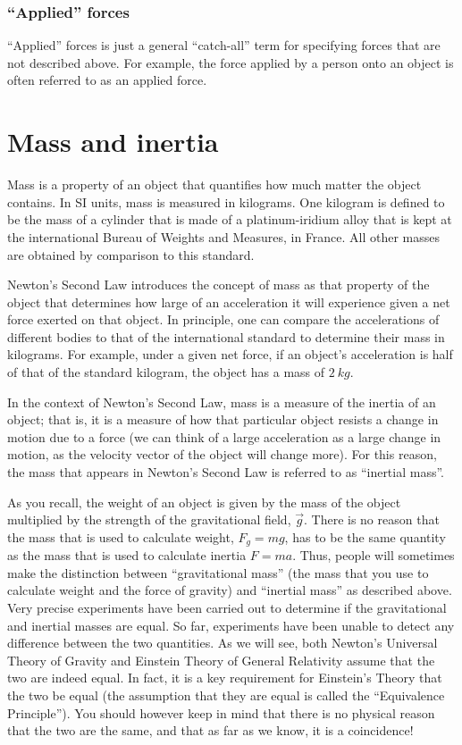 \subsubsection{``Applied'' forces}
``Applied'' forces is just a general ``catch-all'' term for specifying forces that are not described above. For example, the force applied by a person onto an object is often referred to as an applied force. 

\section{Mass and inertia}
Mass is a property of an object that quantifies how much matter the object contains. In SI units, mass is measured in kilograms. One kilogram is defined to be the mass of a cylinder that is made of a platinum-iridium alloy that is kept at the international Bureau of Weights and Measures, in France. All other masses are obtained by comparison to this standard. 

Newton's Second Law introduces the concept of mass as that property of the object that determines how large of an acceleration it will experience given a net force exerted on that object. In principle, one can compare the accelerations of different bodies to that of the international standard to determine their mass in kilograms. For example, under a given net force, if an object's acceleration is half of that of the standard kilogram, the object has a mass of $\SI{2}{kg}$. 

In the context of Newton's Second Law, mass is a measure of the inertia of an object; that is, it is a measure of how that particular object resists a change in motion due to a force (we can think of a large acceleration as a large change in motion, as the velocity vector of the object will change more). For this reason, the mass that appears in Newton's Second Law is referred to as ``inertial mass''.

As you recall, the weight of an object is given by the mass of the object multiplied by the strength of the gravitational field, $\vec g$. There is no reason that the mass that is used to calculate weight, $F_g=mg$, has to be the same quantity as the mass that is used to calculate inertia $F=ma$. Thus, people will sometimes make the distinction between ``gravitational mass'' (the mass that you use to calculate weight and the force of gravity) and ``inertial mass'' as described above. Very precise experiments have been carried out to determine if the gravitational and inertial masses are equal. So far, experiments have been unable to detect any difference between the two quantities. As we will see, both Newton's Universal Theory of Gravity and Einstein Theory of General Relativity assume that the two are indeed equal. In fact, it is a key requirement for Einstein's Theory that the two be equal (the assumption that they are equal is called the ``Equivalence Principle''). You should however keep in mind that there is no physical reason that the two are the same, and that as far as we know, it is a coincidence!

